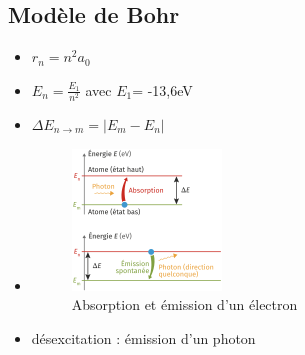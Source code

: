 \documentclass{article}
\begin{document}
\subsection{Modèle de Bohr}
\begin{itemize}
    \item $r_{n} = n^{2}a_{0}$
    \item $E_{n} = \frac{E_{1}}{n^{2}}$ avec $E_{1}$= -13,6eV
    \item $\Delta E_{n\to m} = |E_{m}-E_{n}|$ 
    \item
    \begin{figure}[h]
        \centering
        \includegraphics[scale=0.5]{abs_emi.png}
        \caption{Absorption et émission d'un électron}
    \end{figure}
    \item désexcitation : émission d'un photon
\end{itemize}
\end{document}
